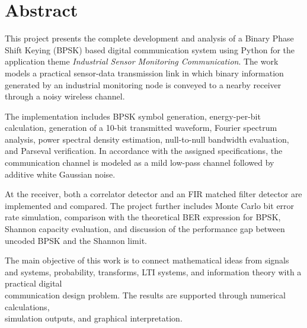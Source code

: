 \chapter*{Abstract}

This project presents the complete development and analysis of a Binary Phase Shift Keying (BPSK) based digital communication system using Python for the application theme \textit{Industrial Sensor Monitoring Communication}. The work models a practical sensor-data transmission link in which binary information generated by an industrial monitoring node is conveyed to a nearby receiver through a noisy wireless channel.

The implementation includes BPSK symbol generation, energy-per-bit calculation,
generation of a 10-bit transmitted waveform, Fourier spectrum analysis, 
power spectral density estimation, null-to-null bandwidth evaluation, 
and Parseval verification. In accordance with the assigned
 specifications, the communication channel is modeled as a mild low-pass channel followed by additive white Gaussian noise.

At the receiver, both a correlator detector and an FIR matched filter detector are implemented and compared. 
The project further includes Monte Carlo bit error rate simulation, comparison with the theoretical BER expression for BPSK,
Shannon capacity evaluation, and discussion of the performance gap between uncoded BPSK and the Shannon limit.

The main objective of this work is to connect mathematical ideas from signals and systems, probability, transforms, LTI systems, and information theory with a practical digital
\\communication design problem. The results are supported through numerical calculations,\\
simulation outputs, and graphical interpretation.


\clearpage